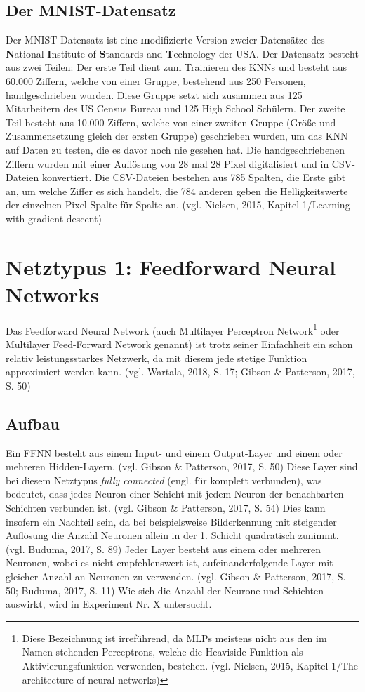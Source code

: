 \documentclass[a4paper,12pt,ngerman,oneside]{scrreprt}	%
\newcommand{\practitioner}[1]{(vgl. Gibson \& Patterson, 2017, S. {#1})}
\newcommand{\fundamentals}[1]{(vgl. Buduma, 2017, S. {#1})}
\begin{document}
		\section{Der MNIST-Datensatz}\label{MNIST}
		Der MNIST Datensatz ist eine \textbf{m}odifizierte Version zweier Datensätze des \textbf{N}ational \textbf{I}nstitute of \textbf{S}tandards and \textbf{T}echnology der USA. Der Datensatz besteht aus zwei Teilen: Der erste Teil dient zum Trainieren des KNNs und besteht aus 60.000 Ziffern, welche von einer Gruppe, bestehend aus 250 Personen, handgeschrieben wurden. Diese Gruppe setzt sich zusammen aus 125 Mitarbeitern des US Census Bureau und 125 High School Schülern. Der zweite Teil besteht aus 10.000 Ziffern, welche von einer zweiten Gruppe (Größe und Zusammensetzung gleich der ersten Gruppe) geschrieben wurden, um das KNN auf Daten zu testen, die es davor noch nie gesehen hat. Die handgeschriebenen Ziffern wurden mit einer Auflösung von 28 mal 28 Pixel digitalisiert und in CSV-Dateien konvertiert. Die CSV-Dateien bestehen aus 785 Spalten, die Erste gibt an, um welche Ziffer es sich handelt, die 784 anderen geben die Helligkeitswerte der einzelnen Pixel Spalte für Spalte an. (vgl. Nielsen, 2015, Kapitel 1/Learning with gradient descent)



	\chapter{Netztypus 1: Feedforward Neural Networks}
	Das Feedforward Neural Network (auch Multilayer Perceptron Network\footnote{Diese Bezeichnung ist irreführend, da MLPs meistens nicht aus den im Namen stehenden Perceptrons, welche die Heaviside-Funktion als Aktivierungsfunktion verwenden, bestehen. (vgl. Nielsen, 2015, Kapitel 1/The architecture of neural networks)} oder Multilayer Feed-Forward Network genannt) ist trotz seiner Einfachheit ein schon relativ leistungsstarkes Netzwerk, da mit diesem jede stetige Funktion approximiert werden kann. (vgl. Wartala, 2018, S. 17; Gibson \& Patterson, 2017, S. 50)
		\section{Aufbau}
		Ein FFNN besteht aus einem Input- und einem Output-Layer und einem oder mehreren Hidden-Layern. \practitioner{50} Diese Layer sind bei diesem Netztypus \textit{fully connected} (engl. für komplett verbunden), was bedeutet, dass jedes Neuron einer Schicht mit jedem Neuron der benachbarten Schichten verbunden ist. \practitioner{54} Dies kann insofern ein Nachteil sein, da bei beispielsweise Bilderkennung mit steigender Auflösung die Anzahl Neuronen allein in der 1. Schicht quadratisch zunimmt. \fundamentals{89} Jeder Layer besteht aus einem oder mehreren Neuronen, wobei es nicht empfehlenswert ist, aufeinanderfolgende Layer mit gleicher Anzahl an Neuronen zu verwenden. (vgl. Gibson \& Patterson, 2017, S. 50; Buduma, 2017, S. 11) Wie sich die Anzahl der Neurone und Schichten auswirkt, wird in Experiment Nr. X untersucht. \\
		
\end{document}
